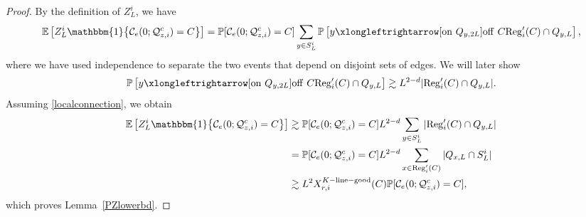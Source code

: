 \documentclass[11pt]{article}
\theoremstyle{definition}
\theoremstyle{remark}
\newcommand{\E}{\mathbb{E}}
\newcommand{\bP}{\mathbb{P}}
\numberwithin{equation}{section}
\theoremstyle{plain}
\theoremstyle{definition}
\theoremstyle{remark}
\theoremstyle{plain}
\newcommand{\ind}[1]{\mathbbm{1}\big\{#1\big\}}
\begin{document}
\begin{proof}
By the definition of $Z_{L}^i$, we have
    \begin{align*}
        \E\left[Z_{L}^i\ind{ \mathcal C_e(0; \mathcal Q_{z, i}^c)=C}\right]=\bP[\mathcal C_e(0; \mathcal Q_{z, i}^c)=C]\sum_{y \in S_L^i}\bP\left[y \xlongleftrightarrow[\mathrm{on}~Q_{y,2L}]{\mathrm{off}~C}\mathrm{Reg}_i'(C)\cap Q_{y,L}\right],
    \end{align*}
where we have used independence to separate the two events that depend on disjoint sets of edges. We will later show
    \begin{align}\label{localconnection}
        \bP\left[y \xlongleftrightarrow[\mathrm{on}~Q_{y,2L}]{\mathrm{off}~C}\mathrm{Reg}_i'(C)\cap Q_{y,L}\right]\gtrsim L^{2-d}|\mathrm{Reg}_i'(C)\cap Q_{y,L}|.
    \end{align}
Assuming \eqref{localconnection}, we obtain
\begin{align*}
   \E\left[Z_{L}^i\ind{ \mathcal C_e(0; \mathcal Q_{z, i}^c)=C}\right]&\gtrsim \bP[\mathcal C_e(0; \mathcal Q_{z, i}^c)=C]L^{2-d}\sum_{y \in S_L^i}|\mathrm{Reg}_i'(C)\cap Q_{y,L}|\\
   &= \bP[\mathcal C_e(0; \mathcal Q_{z, i}^c)=C]L^{2-d}\sum_{x \in \mathrm{Reg}_i'(C)}|Q_{x,L}\cap S_L^i| \\
   &\gtrsim L^2X_{r,i}^{K-\mathrm{line-good}}(C) \bP[\mathcal C_e(0; \mathcal Q_{z, i}^c)=C],
\end{align*}
which proves Lemma~\ref{PZlowerbd}.


\end{proof}
\end{document}
